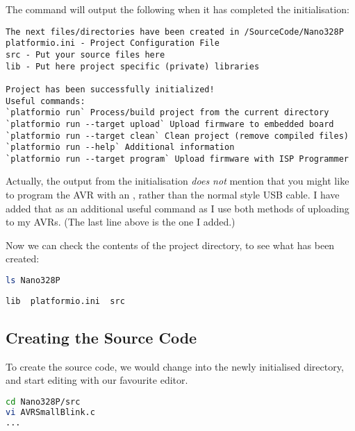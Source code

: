 The command will output the following when it has completed the initialisation:

\begin{lstlisting}[numbers={none},caption={PIO - New Project Initialisation Complete}]
The next files/directories have been created in /SourceCode/Nano328P
platformio.ini - Project Configuration File
src - Put your source files here
lib - Put here project specific (private) libraries

Project has been successfully initialized!
Useful commands:
`platformio run` Process/build project from the current directory
`platformio run --target upload` Upload firmware to embedded board
`platformio run --target clean` Clean project (remove compiled files)
`platformio run --help` Additional information
`platformio run --target program` Upload firmware with ISP Programmer
\end{lstlisting}    

\begin{note}
Actually, the output from the initialisation \emph{does not} mention that you might like to program the AVR with an , rather than the normal  style USB cable. I have added that as an additional useful command as I use both methods of uploading to my AVRs. (The last line above is the one I added.)
\end{note}

Now we can check the contents of the project directory, to see what has been created:

\begin{lstlisting}[language={bash},numbers={none},caption={PIO - Checking New Project Initialisation}]
ls Nano328P
\end{lstlisting}    
    
\begin{lstlisting}[numbers={none},caption={PIO - Checking New Project Initialisation - Result}]
lib  platformio.ini  src
\end{lstlisting}    


\subsection{Creating the Source Code}\label{creating-the-source-code}

To create the source code, we would change into the newly initialised directory, and start editing with our favourite editor. 

\begin{lstlisting}[language={bash},numbers={none},caption={PIO - Creating New Project Source Files}]
cd Nano328P/src
vi AVRSmallBlink.c
...
\end{lstlisting}    

